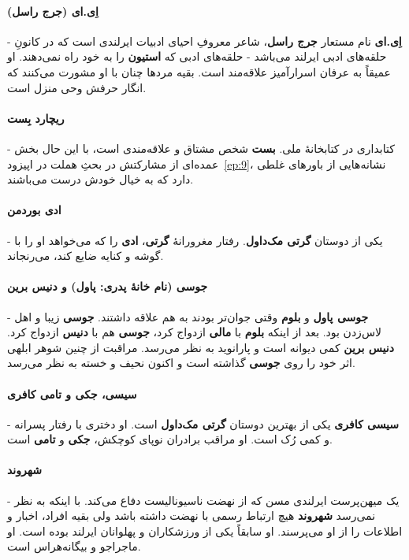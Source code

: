 \documentclass[12pt]{book}
\newcommand{\noun}[1]{{\textbf{#1}}}
\begin{document}
    \paragraph{\noun{اِی.ای (جرج راسل)}\protect{}} -
    \noun{اِی.ای} نام مستعار \noun{جرج راسل‬}، شاعر معروفِ احیای ادبیات ایرلندی است که در کانونِ حلقه‌های ادبی ایرلند می‌باشد - حلقه‌های ادبی که \noun{استیون} را به خود راه نمی‌دهند. او عمیقاً به عرفان اسرارآمیز علاقه‌مند است. بقیه مردها چنان با او مشورت می‌کنند که انگار حرفش وحی منزل است.
    \paragraph{\noun{ریچارد بِست}\protect{}} -
    کتابداری در کتابخانهٔ ملی. \noun{بست} شخص مشتاق و علاقه‌مندی است، با این حال بخش عمده‌ای از مشارکتش در بحثِ هملت در اپیزود~\ref{ep:9}، نشانه‌هایی از باورهای غلطی دارد که به خیال خودش درست می‌باشند.
    \paragraph{\noun{ادی بوردمن}\protect{}} -
    یکی از دوستان \noun{گرتی مک‌داول‬}. رفتار مغرورانهٔ \noun{گرتی}، \noun{ادی} را که می‌خواهد او را با گوشه و کنایه ضایع کند، می‌رنجاند.
    \paragraph{\noun{جوسی (نام خانهٔ پدری: پاول) و دنیس برین}\protect{}} -
    \noun{جوسی پاول} و \noun{بلوم} وقتی جوان‌تر بودند به هم علاقه داشتند. \noun{جوسی} زیبا و اهل لاس‌زدن بود. بعد از اینکه \noun{بلوم} با \noun{مالی} ازدواج کرد، \noun{جوسی} هم با \noun{دنیس} ازدواج کرد. \noun{دنیس برین} کمی دیوانه است و پارانوید به نظر می‌رسد. مراقبت از چنین شوهر ابلهی اثر خود را روی \noun{جوسی} گذاشته است و اکنون نحیف و خسته به نظر می‌رسد.
    \paragraph{\noun{سیسی، جکی و تامی کافری}\protect{}} -
    \noun{سیسی کافری} یکی از بهترین دوستان \noun{گرتی مک‌داول‬} است. او دختری با رفتار پسرانه و کمی رُک است. او مراقب برادران نوپای کوچکش، \noun{جکی} و \noun{تامی} است.
    \paragraph{\noun{شهروند}\protect{}} -
    یک میهن‌پرست ایرلندی مسن که از نهضت ناسیونالیست دفاع می‌کند. با اینکه به نظر نمی‌رسد \noun{شهروند‬} هیچ ارتباط رسمی با نهضت داشته باشد ولی بقیه افراد، اخبار و اطلاعات را از او می‌پرسند. او سابقاً یکی از ورزشکاران و پهلوانان ایرلند بوده است. او ماجراجو و بیگانه‌هراس است.
\end{document}
